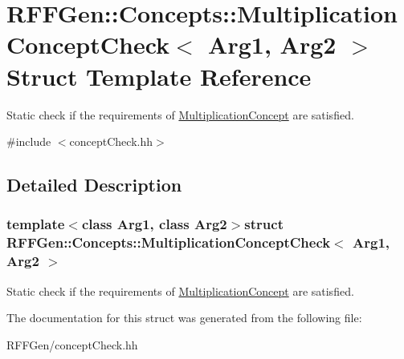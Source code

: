 \hypertarget{structRFFGen_1_1Concepts_1_1MultiplicationConceptCheck}{\section{R\-F\-F\-Gen\-:\-:Concepts\-:\-:Multiplication\-Concept\-Check$<$ Arg1, Arg2 $>$ Struct Template Reference}
\label{structRFFGen_1_1Concepts_1_1MultiplicationConceptCheck}
}


Static check if the requirements of \hyperlink{structRFFGen_1_1Concepts_1_1MultiplicationConcept}{Multiplication\-Concept} are satisfied.  




{\ttfamily \#include $<$concept\-Check.\-hh$>$}



\subsection{Detailed Description}
\subsubsection*{template$<$class Arg1, class Arg2$>$struct R\-F\-F\-Gen\-::\-Concepts\-::\-Multiplication\-Concept\-Check$<$ Arg1, Arg2 $>$}

Static check if the requirements of \hyperlink{structRFFGen_1_1Concepts_1_1MultiplicationConcept}{Multiplication\-Concept} are satisfied. 

The documentation for this struct was generated from the following file\-:\begin{DoxyCompactItemize}
\item 
R\-F\-F\-Gen/concept\-Check.\-hh\end{DoxyCompactItemize}

